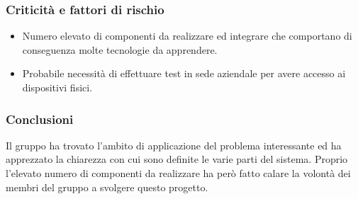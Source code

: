 \subsubsection{Criticità e fattori di rischio}
\begin{itemize}
	\item Numero elevato di componenti da realizzare ed integrare che comportano di conseguenza molte tecnologie da apprendere. 
	\item Probabile necessità di effettuare test in sede aziendale per avere accesso ai dispositivi fisici.
\end{itemize}
\subsubsection{Conclusioni}
Il gruppo ha trovato l'ambito di applicazione del problema interessante ed ha apprezzato la chiarezza con cui sono definite le varie parti del sistema. Proprio l'elevato numero di componenti da realizzare ha però fatto calare la volontà dei membri del gruppo a svolgere questo progetto.
